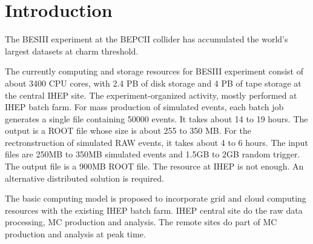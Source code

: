 \section{Introduction}
The BESIII experiment at the BEPCII collider has accumulated
the world's largest datasets at charm threshold.

The currently computing and storage resources for BESIII 
experiment consist of about 3400 CPU cores, with 2.4 PB of disk
storage and 4 PB of tape storage at the central IHEP site.
The experiment-organized activity, mostly performed at IHEP
batch farm. For mass production of simulated events,
each batch job generates a single file containing
50000 events. It takes about 14 to 19 hours. The output
is a ROOT file whose size is about 255 to 350 MB.
For the rectronstruction of simulated RAW events,
it takes about 4 to 6 hours. The input files are
250MB to 350MB simulated events and 1.5GB to 2GB random trigger.
The output file is a 900MB ROOT file.
The resource at IHEP is not enough.
An alternative distributed solution is required.

The basic computing model is proposed to incorporate grid and
cloud computing resources with the existing IHEP batch farm.
IHEP central site do the raw data processing, MC production
and analysis. The remote sites do part of MC production
and analysis at peak time.
